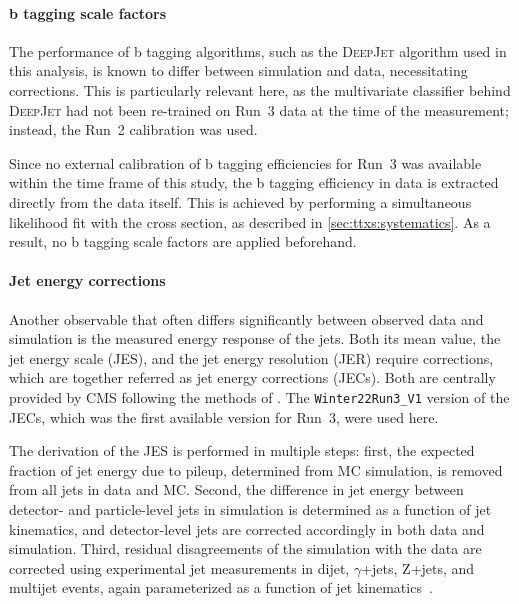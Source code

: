 
\paragraph{b tagging scale factors}

The performance of b tagging algorithms, such as the \textsc{DeepJet} algorithm used in this analysis, is known to differ between simulation and data, necessitating corrections. This is particularly relevant here, as the multivariate classifier behind \textsc{DeepJet} had not been re-trained on Run~3 data at the time of the measurement; instead, the Run~2 calibration was used. 

Since no external calibration of b tagging efficiencies for Run~3 was available within the time frame of this study, the b tagging efficiency in data is extracted directly from the data itself. This is achieved by performing a simultaneous likelihood fit with the \ttbar cross section, as described in \cref{sec:ttxs:systematics}. As a result, no b tagging scale factors are applied beforehand. 

\paragraph{Jet energy corrections}

Another observable that often differs significantly between observed data and simulation is the measured energy response of the jets. Both its mean value, the jet energy scale (JES), and the jet energy resolution (JER) require corrections, which are together referred as jet energy corrections (JECs). Both are centrally provided by CMS following the methods of . The \texttt{Winter22Run3\_V1} version of the JECs, which was the first available version for Run~3, were used here.

The derivation of the JES is performed in multiple steps:
first, the expected fraction of jet energy due to pileup, determined from MC simulation, is removed from all jets in data and MC. Second, the difference in jet energy between detector- and particle-level jets in simulation is determined as a function of jet kinematics, and detector-level jets are corrected accordingly in both data and simulation.
Third, residual disagreements of the simulation with the data are corrected using experimental jet measurements in dijet, $\gamma$+jets, Z+jets, and multijet events, again parameterized as a function of jet kinematics~\cite{CMS:JME-13-004}.

